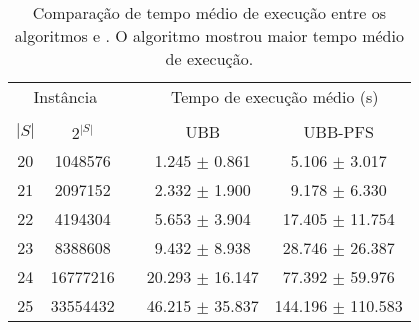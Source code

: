 \begin{table}
\centering
\footnotesize
\begin{tabular}{cc c cc}
\toprule
\multicolumn{2}{c}{Instância} & \phantom{} & \multicolumn{2}{c}{Tempo de execução médio (s)} \\
\cline{1-2}\cline{4-5}\\
$|S|$ & $2^{|S|}$ && UBB & UBB-PFS \\
20 & 1048576 &&  1.245 $\pm$ 0.861 & 5.106 $\pm$ 3.017 \\
21 & 2097152 &&  2.332 $\pm$ 1.900 & 9.178 $\pm$ 6.330 \\
22 & 4194304 &&  5.653 $\pm$ 3.904 & 17.405 $\pm$ 11.754 \\
23 & 8388608 &&  9.432 $\pm$ 8.938 & 28.746 $\pm$ 26.387 \\
24 & 16777216 &&  20.293 $\pm$ 16.147 & 77.392 $\pm$ 59.976 \\
25 & 33554432 &&  46.215 $\pm$ 35.837 & 144.196 $\pm$ 110.583 \\
\bottomrule
\end{tabular}

\caption{Comparação de tempo médio de execução entre os algoritmos 
 e . O algoritmo  mostrou
maior tempo médio de execução.}
\label{tab:ubbpfs_vs_ubb_time}
\end{table}


